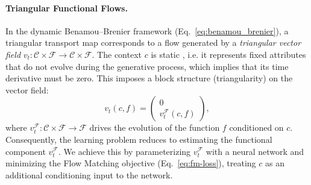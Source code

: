 \paragraph{Triangular Functional Flows.}
In the dynamic Benamou--Brenier framework (Eq.~\ref{eq:benamou_brenier}), a triangular transport map corresponds to a flow generated by a \textit{triangular vector field} $v_t: \mathscr{C} \times \mathcal{F} \to \mathscr{C} \times \mathcal{F}$.
%
The context $c$ is static , i.e. it represents fixed attributes that do not evolve during the generative process, which implies that its time derivative must be zero. This imposes a block structure (triangularity) on the vector field:
\begin{equation}
v_t(c,f) = \begin{pmatrix} 0 \\ v_t^\mathcal{F}(c,f) \end{pmatrix},
\label{eq:triangular_vf}
\end{equation}
where $v_t^\mathcal{F}: \mathscr{C} \times \mathcal{F} \to \mathcal{F}$ drives the evolution of the function $f$ conditioned on $c$.
%
Consequently, the learning problem reduces to estimating the functional component $v_t^\mathcal{F}$. We achieve this by parameterizing $v_t^\mathcal{F}$ with a neural network and minimizing the Flow Matching objective (Eq.~\ref{eq:fm-loss}), treating $c$ as an additional conditioning input to the network.

